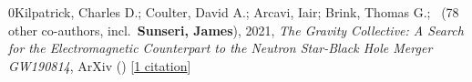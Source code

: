 \item{0}Kilpatrick, Charles D.; Coulter, David A.; Arcavi, Iair; Brink, Thomas G.; \etal\ ({78} other co-authors, incl.\ \textbf{Sunseri, James}), 2021, \emph{The Gravity Collective: A Search for the Electromagnetic Counterpart to the Neutron Star-Black Hole Merger GW190814}, ArXiv () [\href{https://ui.adsabs.harvard.edu/abs/2021arXiv210606897K}{1 citation}]